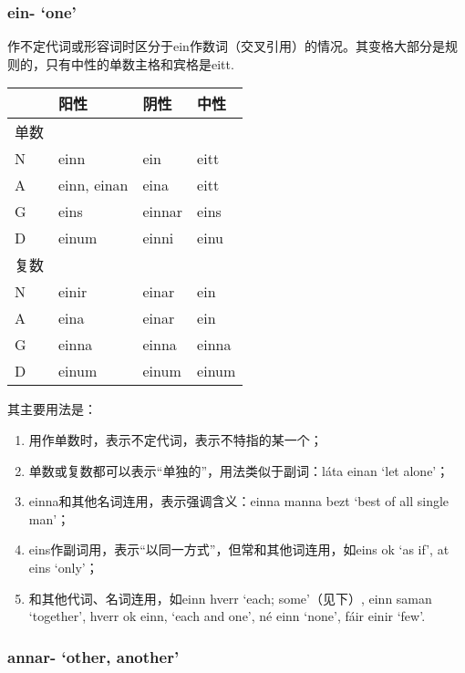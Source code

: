 \subsubsection{ein- `one‌'}
作不定代词或形容词时区分于ein作数词（交叉引用）的情况。其变格大部分是规则的，只有中性的单数主格和宾格是eitt.

\begin{longtable}{llll}
    \toprule
         & 阳性        & 阴性   & 中性  \\
    \midrule
    \endhead
    \bottomrule
    \endfoot
    单数 &             &        &       \\
    N    & einn        & ein    & eitt  \\
    A    & einn, einan & eina   & eitt  \\
    G    & eins        & einnar & eins  \\
    D    & einum       & einni  & einu  \\
    复数 &             &        &       \\
    N    & einir       & einar  & ein   \\
    A    & eina        & einar  & ein   \\
    G    & einna       & einna  & einna \\
    D    & einum       & einum  & einum \\
\end{longtable}

其主要用法是：

\begin{enumerate}
    \item
          用作单数时，表示不定代词，表示不特指的某一个；
    \item
          单数或复数都可以表示``单独的''，用法类似于副词：láta einan `let
          alone'；
    \item
          einna和其他名词连用，表示强调含义：einna manna bezt `best of all
          single man'；
    \item
          eins作副词用，表示``以同一方式''，但常和其他词连用，如eins ok `as if',
          at eins `only'；
    \item
          和其他代词、名词连用，如einn hverr `each; some‌'（见下）, einn saman
          `together', hverr ok einn, `each and one', né einn `none', fáir einir
          `few'.
\end{enumerate}

\subsubsection{annar- `other‌, another'}

